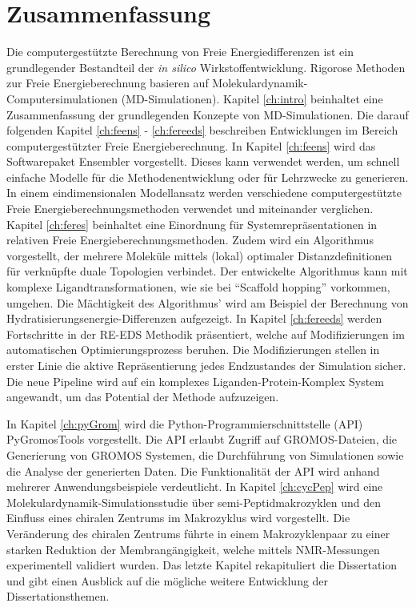 \chapter{Zusammenfassung}
Die computergestützte Berechnung von Freie Energiedifferenzen ist ein grundlegender Bestandteil der \textit{in silico} Wirkstoffentwicklung. Rigorose Methoden zur Freie Energieberechnung basieren auf Molekulardynamik-Computersimulationen (MD-Simulationen). Kapitel \ref{ch:intro} beinhaltet eine Zusammenfassung der grundlegenden Konzepte von MD-Simulationen. 
Die darauf folgenden Kapitel \ref{ch:feens} - \ref{ch:fereeds} beschreiben Entwicklungen im Bereich computergestützter Freie Energieberechnung. 
In Kapitel \ref{ch:feens} wird das Softwarepaket Ensembler vorgestellt. Dieses kann verwendet werden, um schnell einfache Modelle für die Methodenentwicklung oder für Lehrzwecke zu generieren. In einem eindimensionalen Modellansatz werden verschiedene computergestützte Freie Energieberechnungsmethoden verwendet und miteinander verglichen. 
Kapitel \ref{ch:feres} beinhaltet eine Einordnung für Systemrepräsentationen in relativen Freie Energieberechnungsmethoden. Zudem wird ein Algorithmus vorgestellt, der mehrere Moleküle mittels (lokal) optimaler Distanzdefinitionen für verknüpfte duale Topologien verbindet. Der entwickelte Algorithmus kann mit komplexe Ligandtransformationen, wie sie bei ``Scaffold hopping'' vorkommen, umgehen. Die Mächtigkeit des Algorithmus' wird am Beispiel der Berechnung von Hydratisierungsenergie-Differenzen aufgezeigt.
In Kapitel \ref{ch:fereeds} werden Fortschritte in der RE-EDS Methodik präsentiert, welche auf Modifizierungen im automatischen Optimierungsprozess beruhen. Die Modifizierungen stellen in erster Linie die aktive Repräsentierung jedes Endzustandes der Simulation sicher. Die neue Pipeline wird auf ein komplexes Liganden-Protein-Komplex System angewandt, um das Potential der Methode aufzuzeigen.

In Kapitel \ref{ch:pyGrom} wird die Python-Programmierschnittstelle (API) PyGromosTools vorgestellt. Die API erlaubt Zugriff auf GROMOS-Dateien, die Generierung von GROMOS Systemen, die Durchführung von Simulationen sowie die Analyse der generierten Daten. Die Funktionalität der API wird anhand mehrerer Anwendungsbeispiele verdeutlicht.
In Kapitel \ref{ch:cycPep} wird eine Molekulardynamik-Simulationsstudie über semi-Peptidmakrozyklen  und den Einfluss eines chiralen Zentrums im Makrozyklus wird vorgestellt. Die Veränderung des chiralen Zentrums führte in einem Makrozyklenpaar zu einer starken  Reduktion der Membrangängigkeit, welche mittels NMR-Messungen experimentell validiert wurden.
Das letzte Kapitel rekapituliert die Dissertation und gibt einen Ausblick auf die mögliche weitere Entwicklung der Dissertationsthemen.


